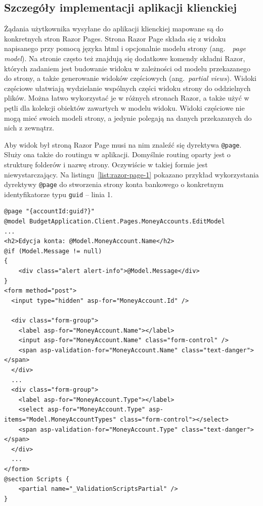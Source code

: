 \subsection{Szczegóły implementacji aplikacji klienckiej}
\label{subsec:szczegoly-implementacji-client}

Żądania użytkownika wysyłane do aplikacji klienckiej mapowane są do konkretnych stron Razor Pages. Strona Razor Page składa się z widoku napisanego przy pomocą języka html i opcjonalnie modelu strony (ang.~~\emph{page model}). Na stronie często też znajdują się dodatkowe komendy składni Razor, których zadaniem jest budowanie widoku w zależności od modelu przekazanego do strony, a także generowanie widoków częściowych (ang.~\emph{partial views}). Widoki częściowe ułatwiają wydzielanie wspólnych części widoku strony do oddzielnych plików. Można łatwo wykorzystać je w różnych stronach Razor, a także użyć w pętli dla kolekcji obiektów zawartych w modelu widoku. Widoki częściowe nie mogą mieć swoich modeli strony, a jedynie polegają na danych przekazanych do nich z zewnątrz.

Aby widok był stroną Razor Page musi na nim znaleźć się dyrektywa \texttt{@page}. Służy ona także do routingu w aplikacji. Domyślnie routing oparty jest o strukturę folderów i nazwę strony. Oczywiście w takiej formie jest niewystarczający. Na listingu~\ref{list:razor-page-1} pokazano przykład wykorzystania dyrektywy \texttt{@page} do stworzenia strony konta bankowego o konkretnym identyfikatorze typu \texttt{guid} -- linia 1.

{\belowcaptionskip=-10pt
\begin{lstlisting}[label=list:razor-page-1,
    caption=Przykład strony Razor Page: \texttt{Edit.cshtml}]
@page "{accountId:guid?}"
@model BudgetApplication.Client.Pages.MoneyAccounts.EditModel
...
<h2>Edycja konta: @Model.MoneyAccount.Name</h2>
@if (Model.Message != null)
{
    <div class="alert alert-info">@Model.Message</div>
}
<form method="post">
  <input type="hidden" asp-for="MoneyAccount.Id" />

  <div class="form-group">
    <label asp-for="MoneyAccount.Name"></label>
    <input asp-for="MoneyAccount.Name" class="form-control" />
    <span asp-validation-for="MoneyAccount.Name" class="text-danger"></span>
  </div>
  ...
  <div class="form-group">
    <label asp-for="MoneyAccount.Type"></label>
    <select asp-for="MoneyAccount.Type" asp-items="Model.MoneyAccountTypes" class="form-control"></select>
    <span asp-validation-for="MoneyAccount.Type" class="text-danger"></span>
  </div>
  ...
</form>
@section Scripts {
    <partial name="_ValidationScriptsPartial" />
}
\end{lstlisting}
}

